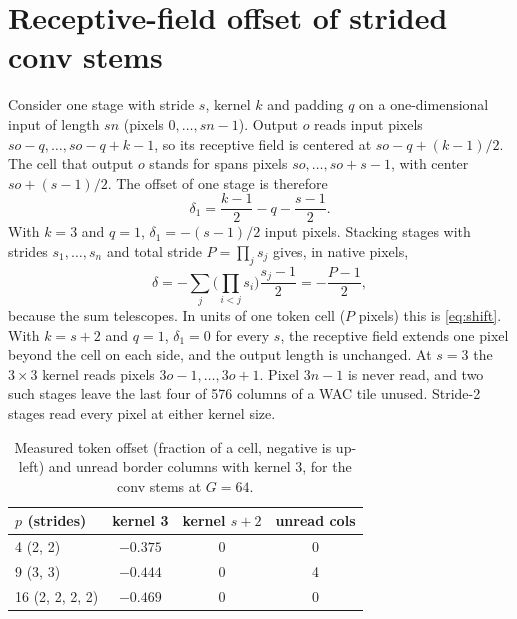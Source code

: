 \clearpage
\setcounter{page}{1}
\maketitlesupplementary
\appendix

\section{Receptive-field offset of strided conv stems}
\label{sec:supp_stem}

Consider one stage with stride $s$, kernel $k$ and padding $q$ on a one-dimensional input of length $sn$ (pixels $0,\dots,sn{-}1$). Output $o$ reads input pixels $so{-}q,\dots,so{-}q{+}k{-}1$, so its receptive field is centered at $so - q + (k{-}1)/2$. The cell that output $o$ stands for spans pixels $so,\dots,so{+}s{-}1$, with center $so + (s{-}1)/2$. The offset of one stage is therefore
\begin{equation}
  \delta_1 = \frac{k-1}{2} - q - \frac{s-1}{2}.
\end{equation}
With $k{=}3$ and $q{=}1$, $\delta_1 = -(s{-}1)/2$ input pixels. Stacking stages with strides $s_1, \dots, s_n$ and total stride $P = \prod_j s_j$ gives, in native pixels,
\begin{equation}
  \delta = -\sum_{j} \Big(\prod_{i<j} s_i\Big)\frac{s_j-1}{2} = -\frac{P-1}{2},
\end{equation}
because the sum telescopes. In units of one token cell ($P$ pixels) this is \cref{eq:shift}. With $k{=}s{+}2$ and $q{=}1$, $\delta_1{=}0$ for every $s$, the receptive field extends one pixel beyond the cell on each side, and the output length is unchanged. At $s{=}3$ the $3\times3$ kernel reads pixels $3o{-}1,\dots,3o{+}1$. Pixel $3n{-}1$ is never read, and two such stages leave the last four of 576 columns of a WAC tile unused. Stride-2 stages read every pixel at either kernel size.

\begin{table}[h]
  \centering
  \small
  \caption{Measured token offset (fraction of a cell, negative is up-left) and unread border columns with kernel 3, for the conv stems at $G{=}64$.}
  \label{tab:supp_shift}
  \begin{tabular}{@{}lccc@{}}
    \toprule
    $p$ (strides) & kernel 3 & kernel $s{+}2$ & unread cols \\
    \midrule
    4 (2, 2)          & $-0.375$ & 0 & 0 \\
    9 (3, 3)          & $-0.444$ & 0 & 4 \\
    16 (2, 2, 2, 2)   & $-0.469$ & 0 & 0 \\
    \bottomrule
  \end{tabular}
\end{table}

